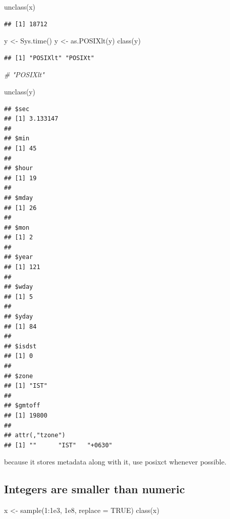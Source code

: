 \documentclass[
]{book}
\newenvironment{Shaded}{\begin{snugshade}}{\end{snugshade}}
\newcommand{\AttributeTok}[1]{\textcolor[rgb]{0.77,0.63,0.00}{#1}}
\newcommand{\CommentTok}[1]{\textcolor[rgb]{0.56,0.35,0.01}{\textit{#1}}}
\newcommand{\ConstantTok}[1]{\textcolor[rgb]{0.00,0.00,0.00}{#1}}
\newcommand{\DecValTok}[1]{\textcolor[rgb]{0.00,0.00,0.81}{#1}}
\newcommand{\FloatTok}[1]{\textcolor[rgb]{0.00,0.00,0.81}{#1}}
\newcommand{\FunctionTok}[1]{\textcolor[rgb]{0.00,0.00,0.00}{#1}}
\newcommand{\NormalTok}[1]{#1}
\newcommand{\OtherTok}[1]{\textcolor[rgb]{0.56,0.35,0.01}{#1}}
\newcommand{\SpecialCharTok}[1]{\textcolor[rgb]{0.00,0.00,0.00}{#1}}
\begin{document}
\begin{Shaded}
\begin{Highlighting}[]
\FunctionTok{unclass}\NormalTok{(x)}
\end{Highlighting}
\end{Shaded}

\begin{verbatim}
## [1] 18712
\end{verbatim}

\begin{Shaded}
\begin{Highlighting}[]
\NormalTok{y }\OtherTok{\textless{}{-}} \FunctionTok{Sys.time}\NormalTok{()}
\NormalTok{y }\OtherTok{\textless{}{-}} \FunctionTok{as.POSIXlt}\NormalTok{(y)}
\FunctionTok{class}\NormalTok{(y)}
\end{Highlighting}
\end{Shaded}

\begin{verbatim}
## [1] "POSIXlt" "POSIXt"
\end{verbatim}

\begin{Shaded}
\begin{Highlighting}[]
\CommentTok{\# "POSIXlt"}

\FunctionTok{unclass}\NormalTok{(y)}
\end{Highlighting}
\end{Shaded}

\begin{verbatim}
## $sec
## [1] 3.133147
## 
## $min
## [1] 45
## 
## $hour
## [1] 19
## 
## $mday
## [1] 26
## 
## $mon
## [1] 2
## 
## $year
## [1] 121
## 
## $wday
## [1] 5
## 
## $yday
## [1] 84
## 
## $isdst
## [1] 0
## 
## $zone
## [1] "IST"
## 
## $gmtoff
## [1] 19800
## 
## attr(,"tzone")
## [1] ""      "IST"   "+0630"
\end{verbatim}

because it stores metadata along with it, use posixct whenever possible.

\hypertarget{integers-are-smaller-than-numeric}{%
\subsection{Integers are smaller than numeric}\label{integers-are-smaller-than-numeric}}

\begin{Shaded}
\begin{Highlighting}[]
\NormalTok{x }\OtherTok{\textless{}{-}} \FunctionTok{sample}\NormalTok{(}\DecValTok{1}\SpecialCharTok{:}\FloatTok{1e3}\NormalTok{, }\FloatTok{1e8}\NormalTok{, }\AttributeTok{replace =} \ConstantTok{TRUE}\NormalTok{)}
\FunctionTok{class}\NormalTok{(x)}
\end{Highlighting}
\end{Shaded}
\end{document}
